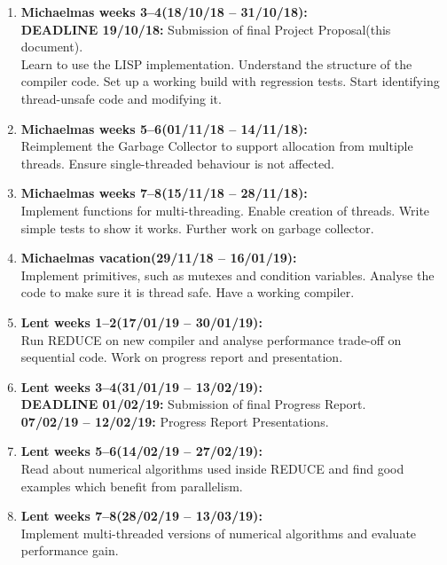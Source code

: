 \documentclass[12pt,a4paper,twoside]{article}
\begin{document}
\begin{enumerate}

\item \textbf{Michaelmas weeks 3--4(18/10/18 -- 31/10/18):} \\
\textbf{DEADLINE 19/10/18:} Submission of final Project Proposal(this document). \\
Learn to use the LISP implementation. Understand the structure of the compiler code.
Set up a working build with regression tests. Start identifying thread-unsafe code and
modifying it.

\item \textbf{Michaelmas weeks 5--6(01/11/18 -- 14/11/18):} \\
Reimplement the Garbage Collector to support allocation from multiple threads.
Ensure single-threaded behaviour is not affected.

\item \textbf{Michaelmas weeks 7--8(15/11/18 -- 28/11/18):} \\
Implement functions for multi-threading. Enable creation of threads. Write simple
tests to show it works. Further work on garbage collector.

\item \textbf{Michaelmas vacation(29/11/18 -- 16/01/19):} \\
Implement primitives, such as mutexes and condition variables. Analyse the code to
make sure it is thread safe. Have a working compiler.

\item \textbf{Lent weeks 1--2(17/01/19 -- 30/01/19):} \\
Run REDUCE on new compiler and analyse performance trade-off on sequential code.
Work on progress report and presentation.

\item \textbf{Lent weeks 3--4(31/01/19 -- 13/02/19):} \\
\textbf{DEADLINE 01/02/19:} Submission of final Progress Report. \\
\textbf{07/02/19 -- 12/02/19:} Progress Report Presentations. \\

\item \textbf{Lent weeks 5--6(14/02/19 -- 27/02/19):} \\
Read about numerical algorithms used inside REDUCE and find
good examples which benefit from parallelism.

\item \textbf{Lent weeks 7--8(28/02/19 -- 13/03/19):} \\
Implement multi-threaded versions of numerical algorithms and
evaluate performance gain.


\end{enumerate}
\end{document}
